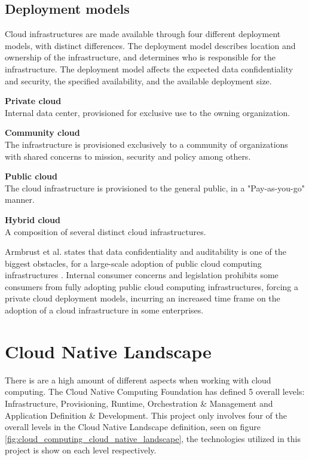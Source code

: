 
\subsection{Deployment models}
Cloud infrastructures are made available through four different deployment models, with distinct differences. The deployment model describes  location and ownership of the infrastructure, and determines who is responsible for the infrastructure. The deployment model affects the expected data confidentiality and security, the specified availability, and the available deployment size.

\textbf{Private cloud}\\
Internal data center, provisioned for exclusive use to the owning organization.

\textbf{Community cloud}\\
The infrastructure is provisioned exclusively to a community of organizations with shared concerns to mission, security and policy among others.

\textbf{Public cloud}\\
The cloud infrastructure is provisioned to the general public, in a "Pay-as-you-go" manner.

\textbf{Hybrid cloud}\\
A composition of several distinct cloud infrastructures.


Armbrust et al. states that data confidentiality and auditability is one of the biggest obstacles, for a large-scale adoption of public cloud computing infrastructures \cite{armbrust2010view}. Internal consumer concerns and legislation prohibits some consumers from fully adopting public cloud computing infrastructures, forcing a private cloud deployment models, incurring an increased time frame on the adoption of a cloud infrastructure in some enterprises.

\section{Cloud Native Landscape}
There is are a high amount of different aspects when working with cloud computing. The Cloud Native Computing Foundation has defined 5 overall levels: Infrastructure, Provisioning, Runtime, Orchestration \& Management and Application Definition \& Development. This project only involves four of the overall levels in the Cloud Native Landscape definition, seen on figure \ref{fig:cloud_computing_cloud_native_landscape}, the technologies utilized in this project is show on each level respectively.

